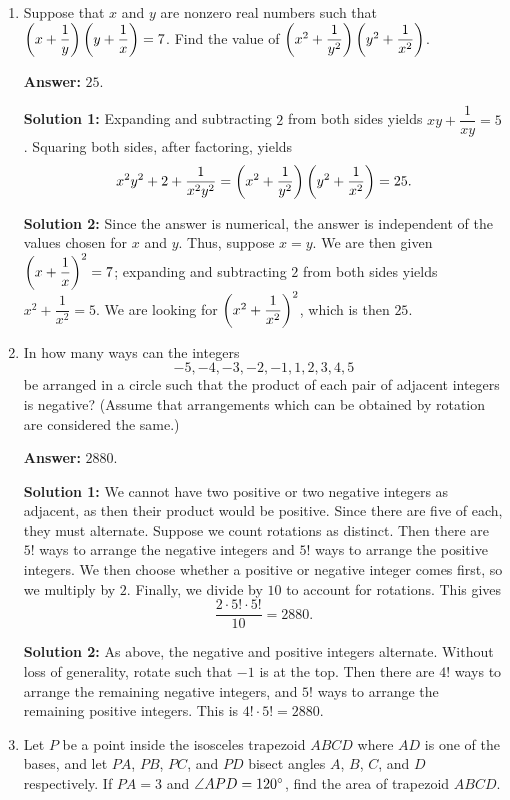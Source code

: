 \documentclass[11pt,paper=letter]{scrartcl}
\begin{document}
\begin{enumerate}[left=0pt]

\item Suppose that $x$ and $y$ are nonzero real numbers such that $\left( x + \dfrac1y \right)\left( y + \dfrac1x \right) = 7$. Find the value of $\left( x^2 + \dfrac 1{y^2} \right)\left( y^2 + \dfrac1{x^2} \right)$.

\textbf{Answer:} $\boxed{25}$.

\textbf{Solution 1:} Expanding and subtracting $2$ from both sides yields $xy + \dfrac1{xy} = 5$. Squaring both sides, after factoring, yields $$x^2y^2 + 2 + \dfrac1{x^2y^2} = \left( x^2 + \dfrac 1{y^2} \right)\left( y^2 + \dfrac1{x^2} \right) = 25.$$

\textbf{Solution 2:} Since the answer is numerical, the answer is independent of the values chosen for $x$ and $y$. Thus, suppose $x = y$. We are then given $\left( x + \dfrac1x \right)^2 = 7$; expanding and subtracting $2$ from both sides yields $x^2 + \dfrac1{x^2} = 5$. We are looking for $\left( x^2 + \dfrac1{x^2} \right)^2$, which is then $25$.

\item In how many ways can the integers $$-5, -4, -3, -2, -1, 1, 2, 3, 4, 5$$ be arranged in a circle such that the product of each pair of adjacent integers is negative? (Assume that arrangements which can be obtained by rotation are considered the same.)

\textbf{Answer:} $\boxed{2880}$.

\textbf{Solution 1:} We cannot have two positive or two negative integers as adjacent, as then their product would be positive. Since there are five of each, they must alternate. Suppose we count rotations as distinct. Then there are $5!$ ways to arrange the negative integers and $5!$ ways to arrange the positive integers. We then choose whether a positive or negative integer comes first, so we multiply by $2$. Finally, we divide by $10$ to account for rotations. This gives $$\frac{2 \cdot 5! \cdot 5!}{10} = 2880.$$

\textbf{Solution 2:} As above, the negative and positive integers alternate. Without loss of generality, rotate such that $-1$ is at the top. Then there are $4!$ ways to arrange the remaining negative integers, and $5!$ ways to arrange the remaining positive integers. This is $4! \cdot 5! = 2880$.

\item Let $P$ be a point inside the isosceles trapezoid $ABCD$ where $AD$ is one of the bases, and let $PA$, $PB$, $PC$, and $PD$ bisect angles $A$, $B$, $C$, and $D$ respectively. If $PA = 3$ and $\angle APD = 120^\circ$, find the area of trapezoid $ABCD$.


\end{enumerate}
\end{document}
